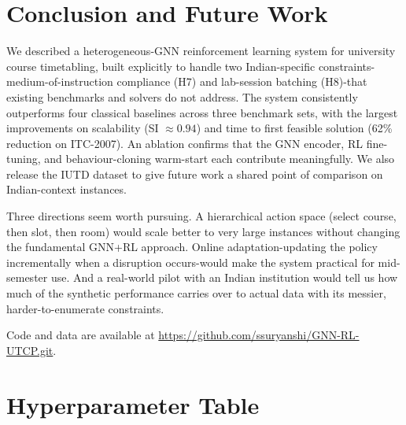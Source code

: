 \documentclass[conference]{IEEEtran}
\begin{document}
\section{Conclusion and Future Work}
\label{sec:conclusion}

We described a heterogeneous-GNN reinforcement learning system for university course timetabling, built explicitly to handle two Indian-specific constraints-medium-of-instruction compliance (H7) and lab-session batching (H8)-that existing benchmarks and solvers do not address. The system consistently outperforms four classical baselines across three benchmark sets, with the largest improvements on scalability (SI $\approx 0.94$) and time to first feasible solution (62\% reduction on ITC-2007). An ablation confirms that the GNN encoder, RL fine-tuning, and behaviour-cloning warm-start each contribute meaningfully. We also release the IUTD dataset to give future work a shared point of comparison on Indian-context instances.

Three directions seem worth pursuing. A hierarchical action space (select course, then slot, then room) would scale better to very large instances without changing the fundamental GNN+RL approach. Online adaptation-updating the policy incrementally when a disruption occurs-would make the system practical for mid-semester use. And a real-world pilot with an Indian institution would tell us how much of the synthetic performance carries over to actual data with its messier, harder-to-enumerate constraints.

Code and data are available at \url{https://github.com/ssuryanshi/GNN-RL-UTCP.git}.


\appendix
\section{Hyperparameter Table}
\label{app:hyperparams}
\end{document}
